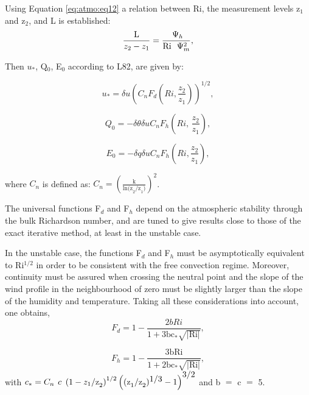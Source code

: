 Using Equation \eqref{eq:atmo:eq12} a relation between Ri, the measurement levels z$_{1}$ and
z$_{2}$, and L is established:
\begin{equation}
\label{eq14}
\frac{\mbox{L}}{z_{2} -z_{1}
}=\frac{\,\,\Psi_{h} }{\mbox{Ri\, }\,\Psi_{m}^{2}},
\end{equation}

Then $u_{\ast} $, Q$_{0}$, E$_{0}$ according to L82, are
given by:

\begin{equation}
\label{eq15}
u_{\ast} =\delta u (C_{n} F_{d} (Ri,\frac{z_{2}}{z_{1}}))^{1/2},
\end{equation}

\begin{equation}
\label{eq16}
Q_{0} =-\delta \theta \delta u C_{n} F_{h} (Ri,\,\frac{z_{2} }{z_{1} }),
\end{equation}

\begin{equation}
\label{eq17}
E_{0} =-\delta q \delta u C_{n} F_{h} (Ri, \frac {z_{2}}{z_{1}} ),
\end{equation}

where $C_{n} $ is defined as: $C_{n} =\left(
{\frac{\mbox{k}}{\mbox{ln(z}_{2} \mbox{/z}_{1} )}}
\right)^{2}$.

The universal functions F$_{d}$ and F$_{h}$ depend on the atmospheric
stability through the bulk Richardson number, and are tuned to give results
close to those of the exact iterative method, at least in the unstable case.

In the unstable case, the functions F$_{d}$ and F$_{h}$ must be
asymptotically equivalent to Ri$^{1/2}$ in order to be consistent with the
free convection regime. Moreover, continuity must be assured when crossing
the neutral point and the slope of the wind profile in the neighbourhood of
zero must be slightly larger than the slope of the humidity and temperature.
Taking all these considerations into account, one obtains,
\begin{equation}
\label{eq18}
F_{d} =1-\frac{2bRi
}{1+\mbox{3bc}_{\ast} \sqrt {\left| {\mbox{Ri}} \right|} },
\end{equation}

\begin{equation}
\label{eq19}
F_{h}
=1-\frac{\mbox{3bRi}}{1+\mbox{2bc}_{\ast} \sqrt
{\left| {\mbox{Ri}} \right|} },
\end{equation}
with $c_{\ast} =C_{n} {\kern 1pt}{\kern
1pt}{\kern 1pt}{\kern 1pt}c{\kern 1pt}{\kern 1pt}{\kern 1pt}\left(
{1-z_{1} \mbox{/z}_{2} }
\right)^{1/2}\left( {\mbox{(z}_{1} \mbox{/z}_{2}
)^{\mbox{1/3}}-1} \right)^{\mbox{3/2}}$ and b $=$ c $=$ 5.

